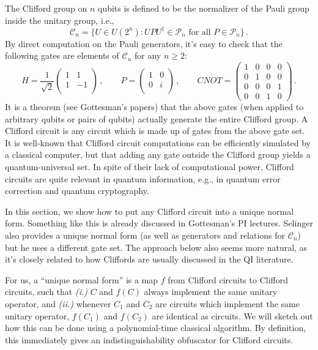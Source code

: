 \documentclass[11pt]{article}
\numberwithin{equation}{section}
\begin{document}
The Clifford group on $n$ qubits is defined to be the normalizer of the Pauli group inside the unitary group, i.e.,
$$
\mathcal C_n = \{ U \in U(2^n) : U P U^\dagger \in \mathcal P_n \text{ for all } P \in \mathcal P_n\}\,.
$$
By direct computation on the Pauli generators, it's easy to check that the following gates are elements of $\mathcal C_n$ for any $n \geq 2$:
$$
H = \frac{1}{\sqrt{2}}
\begin{pmatrix} 
1 & 1 \\
1 & -1 \\
\end{pmatrix}\,,
\qquad
P = 
\begin{pmatrix} 
1 & 0 \\
0 & i \\
\end{pmatrix}\,,
\qquad
CNOT = 
\begin{pmatrix} 
1 & 0 & 0 & 0 \\
0 & 1 & 0 & 0 \\
0 & 0 & 0 & 1 \\
0 & 0 & 1 & 0
\end{pmatrix}\,.
$$
It is a theorem (see Gottesman's papers) that the above gates (when applied to arbitrary qubits or pairs of qubits) actually generate the entire Clifford group. A Clifford circuit is any circuit which is made up of gates from the above gate set. It is well-known that Clifford circuit computations can be efficiently simulated by a classical computer, but that adding any gate outside the Clifford group yields a quantum-universal set. In spite of their lack of computational power, Clifford circuits are quite relevant in quantum information, e.g., in quantum error correction and quantum cryptography.

In this section, we show how to put any Clifford circuit into a unique normal form. Something like this is already discussed in Gottesman's PI lectures. Selinger also provides a unique normal form (as well as generators and relations for $\mathcal C_n$) but he uses a different gate set. The approach below also seems more natural, as it's closely related to how Cliffords are usually discussed in the QI literature.

For us, a ``unique normal form'' is a map $f$ from Clifford circuits to Clifford circuits, such that \emph{(i.)} $C$ and $f(C)$ always implement the same unitary operator, and \emph{(ii.)} whenever $C_1$ and $C_2$ are circuits which implement the same unitary operator, $f(C_1)$ and $f(C_2)$ are identical as circuits. We will sketch out how this can be done using a polynomial-time classical algorithm. By definition, this immediately gives an indistinguishability obfuscator for Clifford circuits. 
\end{document}

